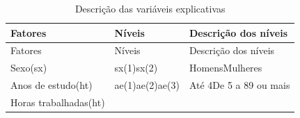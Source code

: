 \documentclass[]{book}
\theoremstyle{definition}
\theoremstyle{definition}
\theoremstyle{definition}
\theoremstyle{remark}
\begin{document}
\begin{longtable}[]{@{}lll@{}}
\caption{\label{tab:varexp}Descrição das variáveis
explicativas}\tabularnewline
\toprule
\begin{minipage}[b]{0.38\columnwidth}\raggedright\strut
Fatores\strut
\end{minipage} & \begin{minipage}[b]{0.10\columnwidth}\raggedright\strut
Níveis\strut
\end{minipage} & \begin{minipage}[b]{0.25\columnwidth}\raggedright\strut
Descrição dos níveis\strut
\end{minipage}\tabularnewline
\midrule
\endfirsthead
\toprule
\begin{minipage}[b]{0.38\columnwidth}\raggedright\strut
Fatores\strut
\end{minipage} & \begin{minipage}[b]{0.10\columnwidth}\raggedright\strut
Níveis\strut
\end{minipage} & \begin{minipage}[b]{0.25\columnwidth}\raggedright\strut
Descrição dos níveis\strut
\end{minipage}\tabularnewline
\midrule
\endhead
\begin{minipage}[t]{0.38\columnwidth}\raggedright\strut
Sexo(sx)\strut
\end{minipage} & \begin{minipage}[t]{0.10\columnwidth}\raggedright\strut
sx(1)sx(2)\strut
\end{minipage} & \begin{minipage}[t]{0.25\columnwidth}\raggedright\strut
HomensMulheres\strut
\end{minipage}\tabularnewline
\begin{minipage}[t]{0.38\columnwidth}\raggedright\strut
Anos de estudo(ht)\strut
\end{minipage} & \begin{minipage}[t]{0.10\columnwidth}\raggedright\strut
ae(1)ae(2)ae(3)\strut
\end{minipage} & \begin{minipage}[t]{0.25\columnwidth}\raggedright\strut
Até 4De 5 a 89 ou mais\strut
\end{minipage}\tabularnewline
\begin{minipage}[t]{0.38\columnwidth}\raggedright\strut
Horas trabalhadas(ht)\strut
\end{minipage} & \begin{minipage}[t]{0.10\columnwidth}\raggedright\strut

\end{minipage}
\end{longtable}
\end{document}
